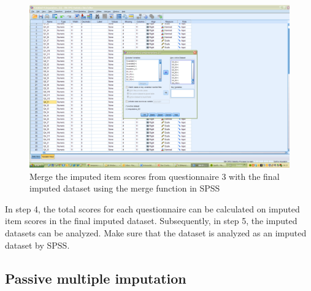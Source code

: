 \documentclass[]{book}
\begin{document}
\begin{figure}

{\centering \includegraphics[width=0.9\linewidth]{images/fig8.9} 

}

\caption{Merge the imputed item scores from questionnaire 3 with the final imputed dataset using the merge function in SPSS}\label{fig:fig8-9}
\end{figure}

In step 4, the total scores for each questionnaire can be calculated on
imputed item scores in the final imputed dataset. Subsequently, in step
5, the imputed datasets can be analyzed. Make sure that the dataset is
analyzed as an imputed dataset by SPSS.

\subsection{Passive multiple
imputation}\label{passive-multiple-imputation}
\end{document}
